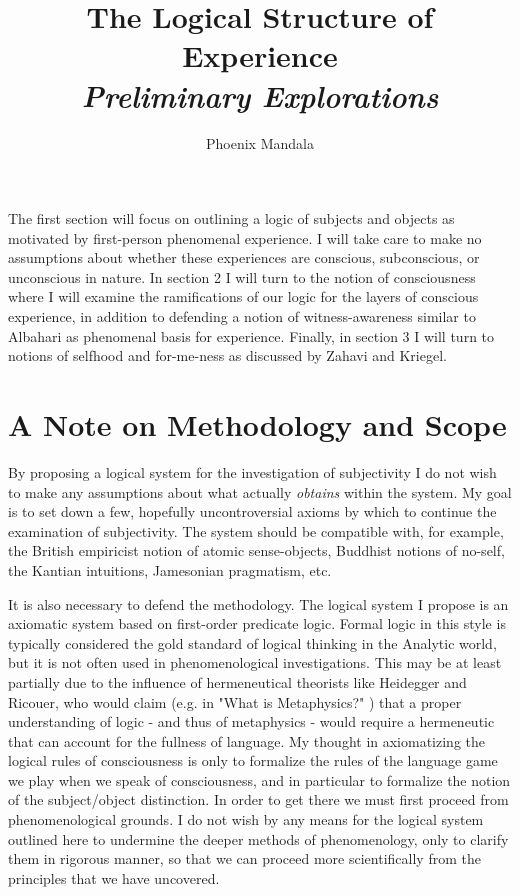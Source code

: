 \documentclass[leqno]{article}
\title{%
\Large The Logical Structure of Experience \\ \large \emph{Preliminary
Explorations} }
\author{Phoenix Mandala}
\date{}
\begin{document}
	\maketitle

	 \alert{The first section will focus on outlining a logic of subjects and objects as motivated by first-person phenomenal experience. I will take care to make no assumptions about whether these experiences are conscious, subconscious, or unconscious in nature. In section 2 I will turn to the notion of consciousness where I will examine the ramifications of our logic for the layers of conscious experience, in addition to defending a notion of witness-awareness similar to Albahari as phenomenal basis for experience. Finally, in section 3 I will turn to notions of selfhood and for-me-ness as discussed by Zahavi and Kriegel.}

	\setcounter{section}{-1}
	\section{A Note on Methodology and Scope}

	By proposing a logical system for the investigation of subjectivity I do not wish
	to make any assumptions about what actually \emph{obtains} within the system. My
	goal is to set down a few, hopefully uncontroversial axioms by which to
	continue the examination of subjectivity. The system should be compatible with,
	for example, the British empiricist notion of atomic sense-objects, Buddhist
	notions of no-self, the Kantian intuitions, Jamesonian pragmatism, etc.

	It is also necessary to defend the methodology. The logical system I propose
	is an axiomatic system based on first-order predicate logic. Formal logic in this
	style is typically considered the gold standard of logical thinking in the Analytic
	world, but it is not often used in phenomenological investigations. This may be
	at least partially due to the influence of hermeneutical theorists like Heidegger
	and Ricouer, who would claim (e.g. in "What is Metaphysics?" \autocite{heidegger2008})
	that a proper understanding of logic - and thus of metaphysics - would require
	a hermeneutic that can account for the fullness of language. My thought in
	axiomatizing the logical rules of consciousness is only to formalize the rules
	of the language game we play when we speak of consciousness, and in particular
	to formalize the notion of the subject/object distinction. In order to get
	there we must first proceed from phenomenological grounds. I do not wish by any
	means for the logical system outlined here to undermine the deeper methods of phenomenology,
	only to clarify them in rigorous manner, so that we can proceed more scientifically
	from the principles that we have uncovered.
\end{document}
